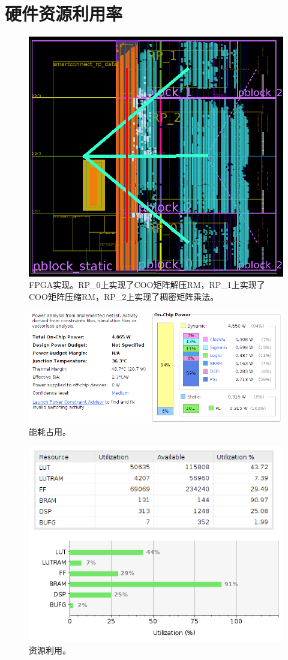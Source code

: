 \section{硬件资源利用率}

\begin{figure}[htbp]
\centerline{\includegraphics[width=0.8\columnwidth]{figures/a.png}}
\caption{FPGA实现。RP\_0上实现了COO矩阵解压RM，RP\_1上实现了COO矩阵压缩RM，RP\_2上实现了稠密矩阵乘法。}
\label{fig:a}
\end{figure}

\begin{figure}[htbp]
\centerline{\includegraphics[width=0.8\columnwidth]{figures/b.png}}
\caption{能耗占用。}
\label{fig:b}
\end{figure}

\begin{figure}[htbp]
\centerline{\includegraphics[width=0.8\columnwidth]{figures/c.png}}
\caption{资源利用。}
\label{fig:c}
\end{figure}

